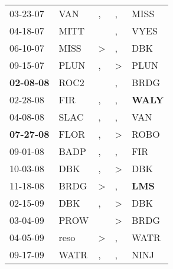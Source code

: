 \begin{supertabular}{p{0.07\textwidth}p{0.06\textwidth}p{0.02\textwidth}p{0.02\textwidth}p{0.06\textwidth}}
          03-23-07\textsuperscript{} &            VAN\textsuperscript{} &                , &             , &           MISS\textsuperscript{} \\
          04-18-07\textsuperscript{} &           MITT\textsuperscript{} &                  &             , &           VYES\textsuperscript{} \\
          06-10-07\textsuperscript{} &           MISS\textsuperscript{} &     \textgreater &             , &            DBK\textsuperscript{} \\
          09-15-07\textsuperscript{} &           PLUN\textsuperscript{} &                , &  \textgreater &           PLUN\textsuperscript{} \\
 \textbf{02-08-08\textsuperscript{}} &           ROC2\textsuperscript{} &                  &             , &           BRDG\textsuperscript{} \\
          02-28-08\textsuperscript{} &            FIR\textsuperscript{} &                , &             , &  \textbf{WALY\textsuperscript{}} \\
          04-08-08\textsuperscript{} &           SLAC\textsuperscript{} &                , &             , &            VAN\textsuperscript{} \\
 \textbf{07-27-08\textsuperscript{}} &           FLOR\textsuperscript{} &                , &  \textgreater &           ROBO\textsuperscript{} \\
          09-01-08\textsuperscript{} &           BADP\textsuperscript{} &                , &             , &            FIR\textsuperscript{} \\
          10-03-08\textsuperscript{} &            DBK\textsuperscript{} &                , &  \textgreater &            DBK\textsuperscript{} \\
          11-18-08\textsuperscript{} &           BRDG\textsuperscript{} &     \textgreater &             , &   \textbf{LMS\textsuperscript{}} \\
          02-15-09\textsuperscript{} &            DBK\textsuperscript{} &                , &  \textgreater &            DBK\textsuperscript{} \\
          03-04-09\textsuperscript{} &           PROW\textsuperscript{} &                  &  \textgreater &           BRDG\textsuperscript{} \\
          04-05-09\textsuperscript{} &           reso\textsuperscript{} &     \textgreater &             , &           WATR\textsuperscript{} \\
          09-17-09\textsuperscript{} &           WATR\textsuperscript{} &                , &             , &           NINJ\textsuperscript{} \\

\end{supertabular}
